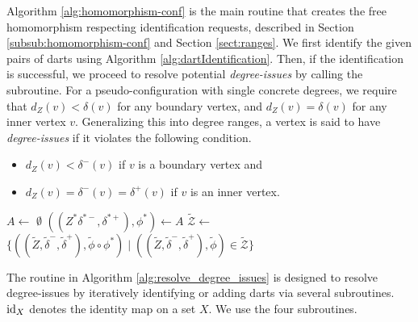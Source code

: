 \documentclass[main.tex]{subfiles}
\begin{document}
Algorithm \ref{alg:homomorphism-conf} is the main routine that creates the free homomorphism respecting identification requests, described in Section \ref{subsub:homomorphism-conf} and Section \ref{sect:ranges}.
We first identify the given pairs of darts using Algorithm \ref{alg:dartIdentification}.
Then, if the identification is successful, we proceed to resolve potential \emph{degree-issues} by calling the \resolveDegreeIssues subroutine.
For a pseudo-configuration with single concrete degrees, we require that $d_Z(v) < \delta(v)$ for any boundary vertex, and $d_Z(v)=\delta(v)$ for any inner vertex $v$.
Generalizing this into degree ranges, a vertex is said to have \emph{degree-issues} if it violates the following condition.
\begin{itemize}
    \item $d_Z(v) < \delta^-(v)$ if $v$ is a boundary vertex and
    \item $d_Z(v) = \delta^-(v) = \delta^+(v)$ if $v$ is an inner vertex.
\end{itemize}

\begin{algorithm}[H]
    \caption{\freeHomomorphismConfigurationWithLink($(Z, \delta^-, \delta^+)$, $\{(e_i, f_i)\}_{i=1}^k$)}
    \label{alg:homomorphism-conf}
    \begin{algorithmic}[1]
        \State $A \gets $
            \State \Return $\emptyset$
        \EndIf
        \State $((Z^* \delta^{*-}, \delta^{*+}), \phi^*) \gets A$
        \State $\tilde{\mathcal{Z}} \gets$ 
        \State \Return $\{((\tilde{Z}, \tilde{\delta}^{-}, \tilde{\delta}^{+}), \tilde{\phi} \circ \phi^*) \mid ((\tilde{Z}, \tilde{\delta}^{-}, \tilde{\delta}^{+}), \tilde{\phi}) \in \tilde{\mathcal{Z}} \}$
    \end{algorithmic}
\end{algorithm}

The \resolveDegreeIssues routine in Algorithm \ref{alg:resolve_degree_issues} is designed to resolve degree-issues by iteratively identifying or adding darts via several subroutines.
$\operatorname{id}_{X}$ denotes the identity map on a set $X$.
We use the four subroutines.
\end{document}
